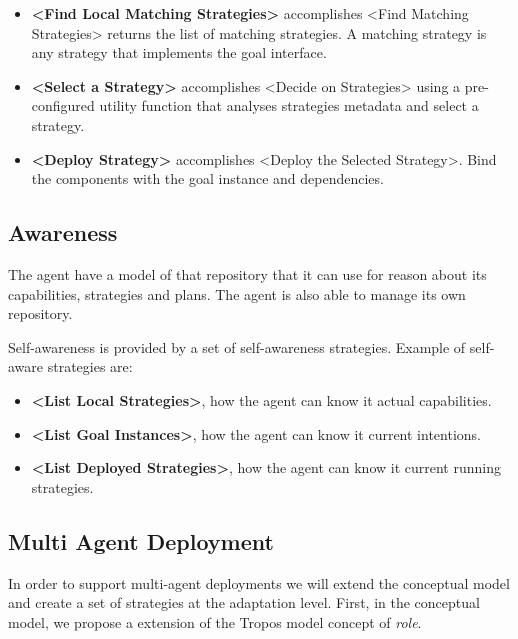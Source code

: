 \begin{itemize}
  \item \textbf{<Find Local Matching Strategies>} accomplishes <Find Matching Strategies>
  returns the list of matching strategies. A matching strategy is any strategy that implements the goal interface.

  \item \textbf{<Select a Strategy>} accomplishes <Decide on Strategies>
  using a pre-configured utility function that analyses strategies metadata and select a strategy.

  \item \textbf{<Deploy Strategy>} accomplishes <Deploy the Selected Strategy>. Bind the components with the goal instance and dependencies.
\end{itemize}

\subsection{Awareness}

The agent have a model of that repository that it can use for reason about its capabilities, strategies and plans. The agent is also able to manage its own repository.

Self-awareness is provided by a set of self-awareness strategies. Example of self-aware strategies are:

\begin{itemize}
  \item \textbf{<List Local Strategies>}, how the agent can know it actual capabilities.

  \item \textbf{<List Goal Instances>}, how the agent can know it current intentions.

  \item \textbf{<List Deployed Strategies>}, how the agent can know it current running strategies.

\end{itemize}


\subsection{Multi Agent Deployment}

In order to support multi-agent deployments we will extend the conceptual model and create a set of strategies at the adaptation level. First, in the conceptual model, we propose a extension of the Tropos model concept of \emph{role}.

